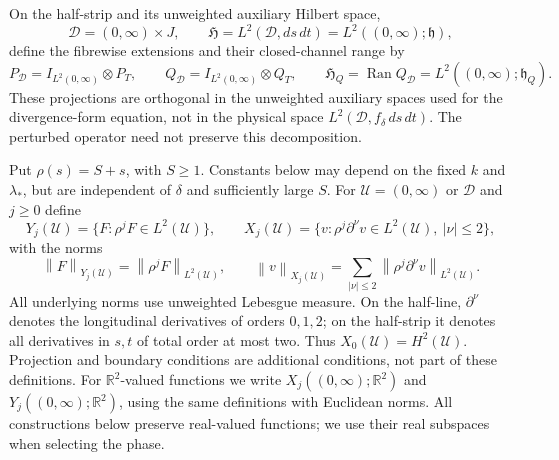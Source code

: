 \documentclass[11pt,a4paper]{article}
\newcommand{\R}{\mathbb R}
\newcommand{\D}{\mathcal D}
\newcommand{\norm}[1]{\left\lVert#1\right\rVert}
\begin{document}
On the half-strip and its unweighted auxiliary Hilbert space,
\[
 \D=(0,\infty)\times J,\qquad
 \mathfrak H=L^2(\D,ds\,dt)=L^2((0,\infty);\mathfrak h),
\]
define the fibrewise extensions and their closed-channel range by
\[
 P_{\D}=I_{L^2(0,\infty)}\otimes P_T,\qquad
 Q_{\D}=I_{L^2(0,\infty)}\otimes Q_T,\qquad
 \mathfrak H_Q=\operatorname{Ran}Q_{\D}
              =L^2((0,\infty);\mathfrak h_Q).
\]
These projections are orthogonal in the unweighted auxiliary spaces
used for the divergence-form equation, not in the physical space
$L^2(\D,f_\delta\,ds\,dt)$. The perturbed operator need not preserve
this decomposition.

Put $\rho(s)=S+s$, with $S\ge1$. Constants below may depend on the
fixed $k$ and $\lambda_*$, but are independent of $\delta$ and sufficiently
large $S$. For $\mathcal U=(0,\infty)$ or $\D$ and $j\ge0$ define
\[
 Y_j(\mathcal U)=\{F:\rho^jF\in L^2(\mathcal U)\},\qquad
 X_j(\mathcal U)=
 \{v:\rho^j\partial^\nu v\in L^2(\mathcal U),\ |\nu|\le2\},
\]
with the norms
\[
 \norm{F}_{Y_j(\mathcal U)}=\norm{\rho^jF}_{L^2(\mathcal U)},\qquad
 \norm{v}_{X_j(\mathcal U)}
 =\sum_{|\nu|\le2}\norm{\rho^j\partial^\nu v}_{L^2(\mathcal U)}.
\]
All underlying norms use unweighted Lebesgue measure. On the half-line,
$\partial^\nu$ denotes the longitudinal derivatives of orders $0,1,2$;
on the half-strip it denotes all derivatives in $s,t$ of total order
at most two. Thus $X_0(\mathcal U)=H^2(\mathcal U)$.
Projection and boundary conditions are additional conditions, not
part of these definitions. For $\R^2$-valued functions we write
$X_j((0,\infty);\R^2)$ and $Y_j((0,\infty);\R^2)$, using the same
definitions with Euclidean norms. All constructions below preserve
real-valued functions; we use their real subspaces when selecting the phase.
\end{document}
